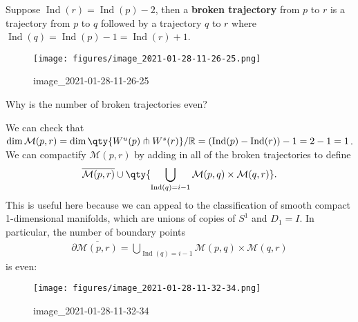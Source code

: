 \begin{definition}

Suppose \(\mathop{\mathrm{Ind}}(r) = \mathop{\mathrm{Ind}}(p) - 2\),
then a \textbf{broken trajectory} from \(p\) to \(r\) is a trajectory
from \(p\) to \(q\) followed by a trajectory \(q\) to \(r\) where
\(\mathop{\mathrm{Ind}}(q) = \mathop{\mathrm{Ind}}(p)-1 = \mathop{\mathrm{Ind}}(r) + 1\).

\begin{figure}
\centering
\texttt{[image: figures/image\_2021-01-28-11-26-25.png]}
\caption{image\_2021-01-28-11-26-25}
\end{figure}

\end{definition}

\begin{question}

Why is the number of broken trajectories even?

\end{question}

\begin{answer}

We can check that
\(\dim \mathcal{M}(p, r) = \dim \qty{ W^u(p) \pitchfork W^s(r)}/{\mathbb{R}}= (\mathop{\mathrm{Ind}}(p) - \mathop{\mathrm{Ind}}(r)) - 1 = 2-1 = 1\).
We can compactify \(\mathcal{M}(p, r)\) by adding in all of the broken
trajectories to define
\begin{align*} 
\overline{\mathcal{M}(p, r)} \cup\qty{ \bigcup_{\mathop{\mathrm{Ind}}(q) = i-1} \mathcal{M}(p, q) \times\mathcal{M}(q, r) } 
.\end{align*}
This is useful here because we can appeal to the classification of
smooth compact 1-dimensional manifolds, which are unions of copies of
\(S^1\) and \(D_1 = I\). In particular, the number of boundary points
\begin{align*}
{{\partial}}\overline{\mathcal{M}(p, r)} = \bigcup_{\mathop{\mathrm{Ind}}(q) = i-1} \mathcal{M}(p, q) \times\mathcal{M}(q, r)
\end{align*}
is even:

\begin{figure}
\centering
\texttt{[image: figures/image\_2021-01-28-11-32-34.png]}
\caption{image\_2021-01-28-11-32-34}
\end{figure}

\end{answer}


